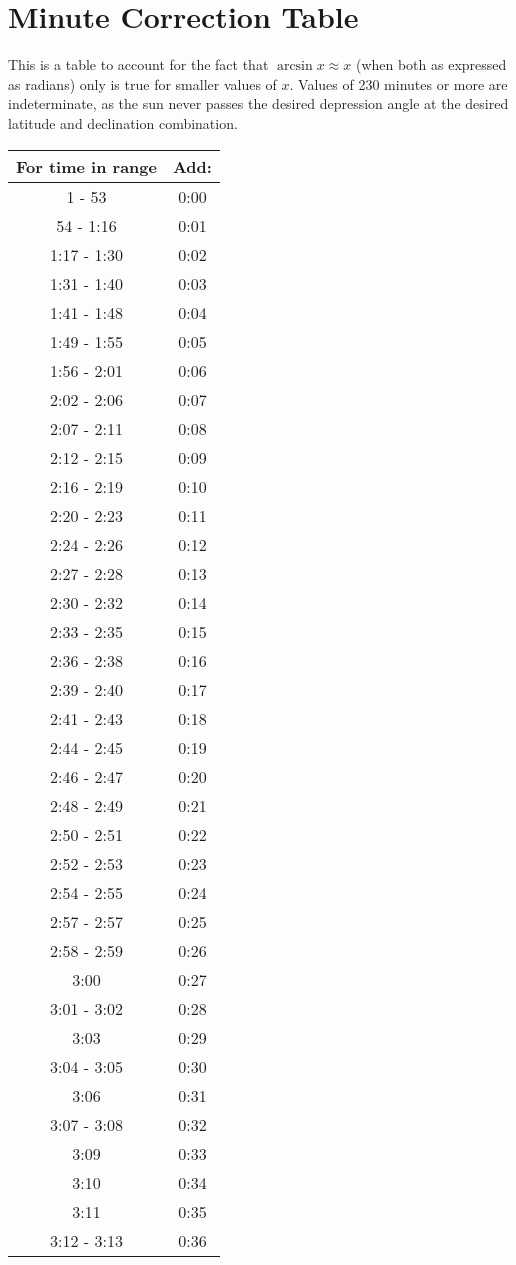 \section{Minute Correction Table}

This is a table to account for the fact that $\arcsin x \approx x$ (when both as expressed as radians) only is true for smaller values of $x$. Values of 230 minutes or more are indeterminate, as the sun never passes the desired depression angle at the desired latitude and declination combination.

	\begin{minipage}{0.5\textwidth}
\begin{tabular}[t]{c|c}
	For time in range & Add: \\\hline
	1 - 53 & 0:00 \\\hline
	54 - 1:16 & 0:01 \\\hline
	1:17 - 1:30 & 0:02 \\\hline
	1:31 - 1:40 & 0:03 \\\hline
	1:41 - 1:48 & 0:04 \\\hline
	1:49 - 1:55 & 0:05 \\\hline
	1:56 - 2:01 & 0:06 \\\hline
	2:02 - 2:06 & 0:07 \\\hline
	2:07 - 2:11 & 0:08 \\\hline
	2:12 - 2:15 & 0:09 \\\hline
	2:16 - 2:19 & 0:10 \\\hline
	2:20 - 2:23 & 0:11 \\\hline
	2:24 - 2:26 & 0:12 \\\hline
	2:27 - 2:28 & 0:13 \\\hline
	2:30 - 2:32 & 0:14 \\\hline
	2:33 - 2:35 & 0:15 \\\hline
	2:36 - 2:38 & 0:16 \\\hline
	2:39 - 2:40 & 0:17 \\\hline
	2:41 - 2:43 & 0:18 \\\hline
	2:44 - 2:45 & 0:19 \\\hline
	2:46 - 2:47 & 0:20 \\\hline
	2:48 - 2:49 & 0:21 \\\hline
	2:50 - 2:51 & 0:22 \\\hline
	2:52 - 2:53 & 0:23 \\\hline
	2:54 - 2:55 & 0:24 \\\hline
	2:57 - 2:57 & 0:25 \\\hline
	2:58 - 2:59 & 0:26 \\\hline
	3:00  & 0:27 \\\hline
	3:01 - 3:02 & 0:28 \\\hline
	3:03 & 0:29 \\\hline
	3:04 - 3:05 & 0:30 \\\hline
	3:06 & 0:31 \\\hline
	3:07 - 3:08 & 0:32 \\\hline
	3:09 & 0:33 \\\hline
	3:10 & 0:34 \\\hline
	3:11 & 0:35 \\\hline
	3:12 - 3:13 & 0:36 \\\hline
	\end{tabular}\end{minipage}
